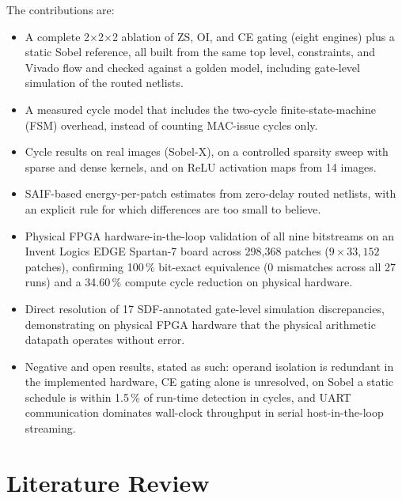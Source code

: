 \documentclass[11pt,journal,draftclsnofoot,onecolumn]{IEEEtran}
\begin{document}
\noindent The contributions are:
\begin{itemize}
\item A complete 2$\times$2$\times$2 ablation of ZS, OI, and CE gating (eight engines) plus a
static Sobel reference, all built from the same top level, constraints, and Vivado
flow and checked against a golden model, including gate-level simulation of the
routed netlists.
\item A measured cycle model that includes the two-cycle finite-state-machine (FSM)
overhead, instead of counting MAC-issue cycles only.
\item Cycle results on real images (Sobel-X), on a controlled sparsity sweep with
sparse and dense kernels, and on ReLU activation maps from 14 images.
\item SAIF-based energy-per-patch estimates from zero-delay routed netlists, with an
explicit rule for which differences are too small to believe.
\item Physical FPGA hardware-in-the-loop validation of all nine bitstreams on an
Invent Logics EDGE Spartan-7 board across 298{,}368 patches ($9 \times 33{,}152$ patches),
confirming 100\,\% bit-exact equivalence (0 mismatches across all 27 runs) and a 34.60\,\%
compute cycle reduction on physical hardware.
\item Direct resolution of 17 SDF-annotated gate-level simulation discrepancies,
demonstrating on physical FPGA hardware that the physical arithmetic datapath operates
without error.
\item Negative and open results, stated as such: operand isolation is redundant in the
implemented hardware, CE gating alone is unresolved, on Sobel a static schedule is
within 1.5\,\% of run-time detection in cycles, and UART communication dominates
wall-clock throughput in serial host-in-the-loop streaming.
\end{itemize}

\section{Literature Review}\label{sec:lit}
\end{document}
